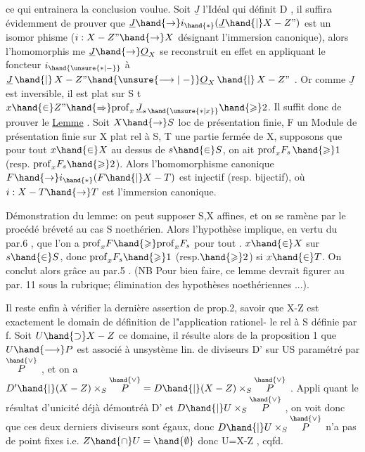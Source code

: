 
\placedmargin{$|$}\placedmargin{$\wr$}ce qui entrainera la conclusion voulue. Soit $\underline{J}$ l'Idéal qui définit
D , il suffira évidemment de prouver que $\underline{J}\hand{\to} i_{\hand{*}}(\underline{J}\hand{|}X-Z")$ est un isomor
phisme ($i:X-Z"\hand{\to} X$ désignant l'immersion canonique), alors l'homomorphis
me $\underline{J}\hand{\to}\underline{O}_X$ se reconstruit en effet en appliquant le foncteur $i_{\hand{\unsure{*|\relbar}}}$ à
$\underline{J}\,\hand{|}\,X-Z" \hand{\unsure{\longrightarrow|\relbar}} \underline{O}_X\,\hand{|}\,X-Z"$ . Or comme $\underline{J}$ est inversible, il est plat sur S t
 $x\hand{\in} Z" \hand{\Rightarrow} \mathrm{prof}_x\,\underline{J}_{s\,\hand{\unsure{*|x}}} \hand{\geqslant} 2$. Il suffit donc de prouver le
\uline{Lemme} . Soit $X\hand{\to} S$ loc de présentation finie, F un Module de présentation
finie sur X plat rel à S, T une partie fermée de X, supposons que pour
tout $x\hand{\in} X$ au dessus de $s\hand{\in} S$, on ait \hand{\unsure{/}} $\mathrm{prof}_x F_{s\,}\hand{\geqslant} 1$ (resp. $\mathrm{prof}_x F_s \hand{\geqslant} 2$).
Alors l'homomorphisme canonique $F\hand{\to} i_{\hand{*}}(F\hand{|}X-T)$ est injectif (resp.
bijectif), où $i:X-T\hand{\to} T$ est l'immersion canonique.

Démonstration du lemme: on peut supposer S,X affines, et on se
ramène par le procédé bréveté au cas S noethérien. Alors l'hypothèse
implique, en vertu du par.6 , que l'on a $\mathrm{prof}_x F \hand{\geqslant} \mathrm{prof}_x F_s$ pour tout .
$x\hand{\in} X$ sur $s\hand{\in} S$, donc $\mathrm{prof}_x F_s \hand{\geqslant} 1$ (resp.$\hand{\geqslant} 2$) si $x\hand{\in} T$. On conclut alors
grâce au par.5 . (NB Pour bien faire, ce lemme devrait figurer au par.
11 sous la rubrique; élimination des hypothèses noethériennes ...).

Il reste enfin à vérifier la dernière assertion de prop.2, savoir
que X-Z est exactement le domain de définition de l"application rationel-%
le rel à S définie par f. Soit $U\hand{\supset} X-Z$ ce domaine, il résulte alors de
la proposition 1 que $U\hand{\longrightarrow} P$ est associé à unsystème lin. de diviseurs
D' sur US paramétré par $\overset{\hand{\vee}}{P}$ , et on a $D'\hand{|}(X-Z)\times_S\overset{\hand{\vee}}{P} = D\hand{|}(X-Z)\times_S\overset{\hand{\vee}}{P}$ . Appli
quant le résultat d'unicité \hand{(}déjà démontré\hand{)}à D' et $D\hand{|}U\times_S\overset{\hand{\vee}}{P}$ , on voit donc
que ces deux derniers diviseurs sont égaux, donc $D\hand{|}U\times_S\overset{\hand{\vee}}{P}$ n'a pas de
point fixes i.e. $Z\hand{\cap} U=\hand{\emptyset}$ donc U=X-Z , cqfd.

